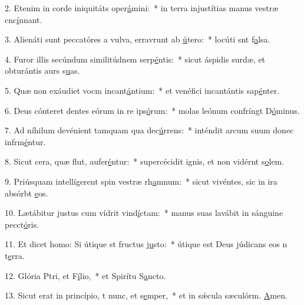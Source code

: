 2. Etenim in corde iniquitáts oper\uline{á}mini:~* in terra injustítias manus vestræ cnc\uline{í}nnant.\par 
3. Alienáti sunt peccatóres a vulva, erravrunt ab \uline{ú}tero:~* locúti snt f\uline{a}lsa.\par 
4. Furor illis secúndum similitúdnem serp\uline{é}ntis:~* sicut áspidis surdæ, et obturántis aurs s\uline{u}as.\par 
5. Quæ non exáudiet vocm incant\uline{á}ntium:~* et venéfici incantántis sap\uline{é}nter.\par 
6. Deus cónteret dentes eórum in re ips\uline{ó}rum:~* molas leónum confríngt D\uline{ó}minus.\par 
7. Ad níhilum devénient tamquam qua dec\uline{ú}rrens:~* inténdit arcum suum donec infrm\uline{é}ntur.\par 
8. Sicut cera, quæ flut, aufer\uline{é}ntur:~* supercécidit ignis, et non vidérnt s\uline{o}lem.\par 
9. Priúsquam intellígerent spin vestræ rh\uline{a}mnum:~* sicut vivéntes, sic in ira absórbt \uline{e}os.\par 
10. Lætábitur justus cum vídrit vind\uline{í}ctam:~* manus suas lavábit in sánguine pecct\uline{ó}ris.\par 
11. Et dicet homo: Si útique st fructus j\uline{u}sto:~* útique est Deus júdicans eos n t\uline{e}rra.\par 
12. Glória Ptri, et F\uline{í}lio,~* et Spirítu S\uline{a}ncto.\par 
13. Sicut erat in princípio, t nunc, et s\uline{e}mper,~* et in sǽcula sæculórm. \uline{A}men.\par 
